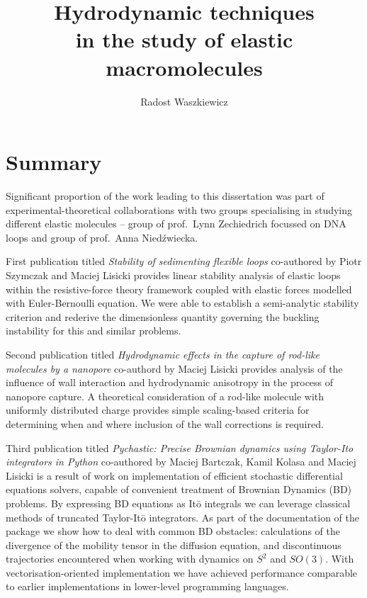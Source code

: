 \documentclass{doctoral}
\title{Hydrodynamic techniques\\in the study of elastic macromolecules}
\author{Radost Waszkiewicz}
\affiliation{University of Warsaw\\Faculty of Physics}
\newcommand{\code}[1]{\texttt{\detokenize{#1}}}
\begin{document}
\maketitle

\section*{Summary}
Significant proportion of the work leading to this dissertation was part of experimental-theoretical collaborations with two groups specialising in studying different elastic molecules -- group of prof.~Lynn Zechiedrich focussed on DNA loops and group of prof.~Anna Niedźwiecka.

First publication titled \emph{Stability of sedimenting flexible loops} co-authored by Piotr Szymczak and Maciej Lisicki provides linear stability analysis of elastic loops within the resistive-force theory framework coupled with elastic forces modelled with Euler-Bernoulli equation.
We were able to establish a semi-analytic stability criterion and rederive the dimensionless quantity governing the buckling instability for this and similar problems.

Second publication titled \emph{Hydrodynamic effects in the capture of rod-like molecules by a nanopore} co-authord by Maciej Lisicki provides analysis of the influence of wall interaction and hydrodynamic anisotropy in the process of nanopore capture.
A theoretical consideration of a rod-like molecule with uniformly distributed charge provides simple scaling-based criteria for determining when and where inclusion of the wall corrections is required.

Third publication titled \emph{Pychastic: Precise Brownian dynamics using Taylor-Ito integrators in Python} co-authored by Maciej Bartczak, Kamil Kolasa and Maciej Lisicki is a result of work on implementation of efficient stochastic differential equations solvers, capable of convenient treatment of Brownian Dynamics (BD) problems.
By expressing BD equations as Itō integrals we can leverage classical methods of truncated Taylor-Itō integrators.
As part of the documentation of the \code{pychastic} package we show how to deal with common BD obstacles: calculations of the divergence of the mobility tensor in the diffusion equation, and discontinuous trajectories encountered when working with dynamics on $S^2$ and $SO(3)$.
With vectorisation-oriented implementation we have achieved performance comparable to earlier implementations in lower-level programming languages.
\end{document}
